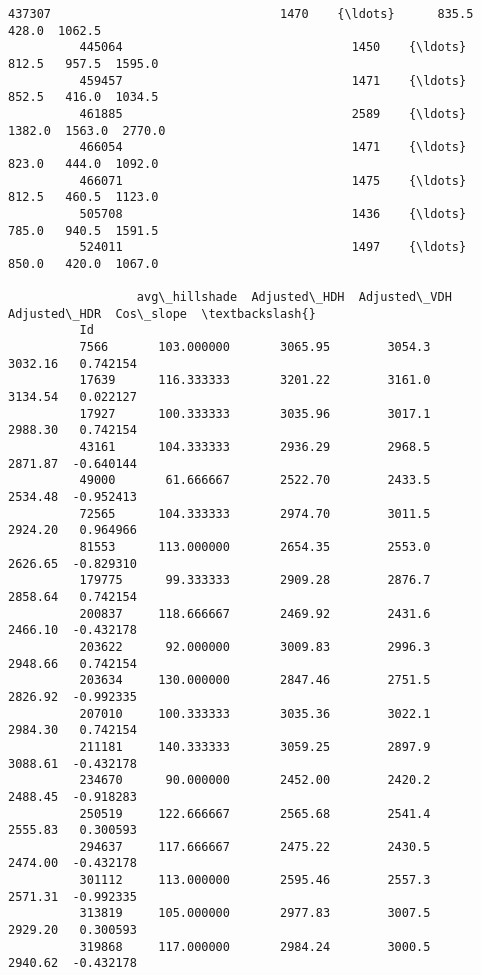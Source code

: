 \documentclass[11pt]{article}
\begin{document}
\begin{Verbatim}[commandchars=\\\{\}]
          437307                                1470    {\ldots}      835.5   428.0  1062.5   
          445064                                1450    {\ldots}      812.5   957.5  1595.0   
          459457                                1471    {\ldots}      852.5   416.0  1034.5   
          461885                                2589    {\ldots}     1382.0  1563.0  2770.0   
          466054                                1471    {\ldots}      823.0   444.0  1092.0   
          466071                                1475    {\ldots}      812.5   460.5  1123.0   
          505708                                1436    {\ldots}      785.0   940.5  1591.5   
          524011                                1497    {\ldots}      850.0   420.0  1067.0   
          
                  avg\_hillshade  Adjusted\_HDH  Adjusted\_VDH  Adjusted\_HDR  Cos\_slope  \textbackslash{}
          Id                                                                           
          7566       103.000000       3065.95        3054.3       3032.16   0.742154   
          17639      116.333333       3201.22        3161.0       3134.54   0.022127   
          17927      100.333333       3035.96        3017.1       2988.30   0.742154   
          43161      104.333333       2936.29        2968.5       2871.87  -0.640144   
          49000       61.666667       2522.70        2433.5       2534.48  -0.952413   
          72565      104.333333       2974.70        3011.5       2924.20   0.964966   
          81553      113.000000       2654.35        2553.0       2626.65  -0.829310   
          179775      99.333333       2909.28        2876.7       2858.64   0.742154   
          200837     118.666667       2469.92        2431.6       2466.10  -0.432178   
          203622      92.000000       3009.83        2996.3       2948.66   0.742154   
          203634     130.000000       2847.46        2751.5       2826.92  -0.992335   
          207010     100.333333       3035.36        3022.1       2984.30   0.742154   
          211181     140.333333       3059.25        2897.9       3088.61  -0.432178   
          234670      90.000000       2452.00        2420.2       2488.45  -0.918283   
          250519     122.666667       2565.68        2541.4       2555.83   0.300593   
          294637     117.666667       2475.22        2430.5       2474.00  -0.432178   
          301112     113.000000       2595.46        2557.3       2571.31  -0.992335   
          313819     105.000000       2977.83        3007.5       2929.20   0.300593   
          319868     117.000000       2984.24        3000.5       2940.62  -0.432178   

\end{Verbatim}
\end{document}
